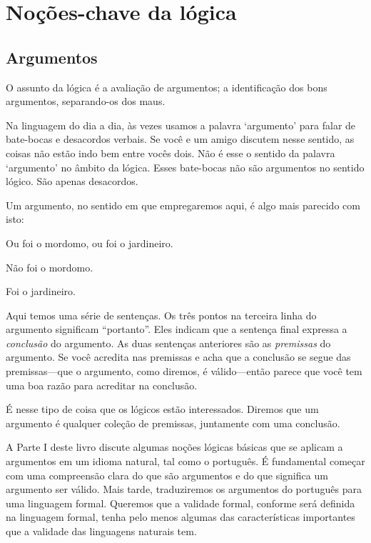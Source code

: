 \part{Noções-chave da lógica}
\label{ch.intro}


\chapter{Argumentos}
\label{s:Arguments}

O assunto da lógica é a avaliação de argumentos; a identificação dos bons argumentos, separando-os dos maus.  

Na linguagem do dia a dia, às vezes usamos a palavra `argumento' para falar de bate-bocas e desacordos verbais.
Se você e um amigo discutem nesse sentido, as coisas não estão indo bem entre vocês dois.
Não é esse o sentido da palavra `argumento' no âmbito da lógica. Esses bate-bocas não são argumentos no sentido lógico. São apenas desacordos.

Um argumento, no sentido em que empregaremos aqui, é algo mais parecido com isto:

	\begin{earg}\label{argButlerGardner}
		\item[] Ou foi o mordomo, ou foi o jardineiro.
		\item[] Não foi o mordomo.
		\item[\therefore] Foi o jardineiro.
	\end{earg}
Aqui temos uma série de sentenças.
Os três pontos na terceira linha do argumento significam ``portanto''.
Eles indicam que a sentença final expressa a \emph{conclusão} do argumento.
As duas sentenças anteriores são as \emph{premissas} do argumento.
Se você acredita nas premissas e acha que a conclusão se segue das premissas---que o argumento, como diremos, é válido---então parece que você tem uma boa razão para acreditar na conclusão.

É nesse tipo de coisa que os lógicos estão interessados. Diremos que um argumento é qualquer coleção de premissas, juntamente com uma conclusão.

A Parte I deste livro discute algumas noções lógicas básicas que se aplicam a argumentos em um idioma natural, tal como o português.
É fundamental começar com uma compreensão clara do que são argumentos e do que significa um argumento ser válido.
Mais tarde, traduziremos os argumentos do português para uma linguagem formal. Queremos que a validade formal, conforme será definida na linguagem formal, tenha pelo menos algumas das características importantes que a validade das linguagens naturais tem.

